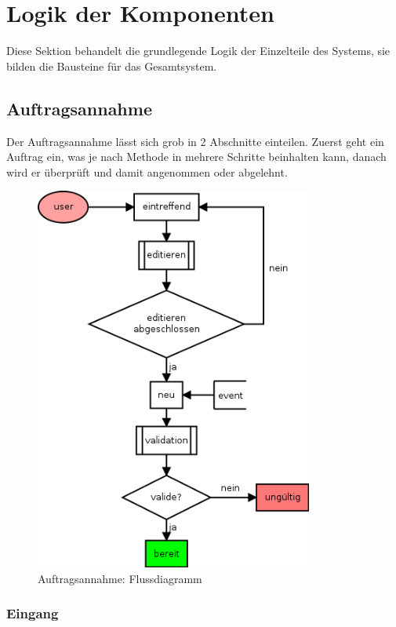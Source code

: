 \section{Logik der Komponenten}

Diese Sektion behandelt die grundlegende Logik  der Einzelteile des Systems,
sie bilden die Bausteine für das Gesamtsystem.


\subsection{Auftragsannahme}

Der Auftragsannahme lässt sich grob in 2 Abschnitte einteilen.
Zuerst geht ein Auftrag ein, was je nach Methode in mehrere Schritte beinhalten kann,
danach wird er überprüft und damit angenommen oder abgelehnt.


\begin{figure}[ht]
  \centering
  \includegraphics[height=5in]{imageinput/lebenszyklus-auftrag-eingang.png}
  \caption{Auftragsannahme: Flussdiagramm}
  \label{fig:lebenszyklus-auftrag-eingang}
\end{figure}


\subsubsection{Eingang}

